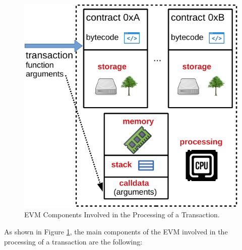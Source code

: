 \begin{figure}[H]
    \centering
    \includegraphics[width=.6\textwidth]{../figures/EVM-structure}
    \caption{EVM Components Involved in the Processing of a Transaction.}
    \label{fig:evm-transaction-processing}
\end{figure}

As shown in Figure \ref{fig:evm-transaction-processing}, the main components of the EVM involved in the processing of a transaction are the following:

